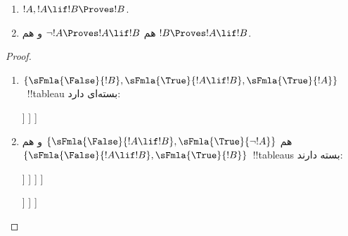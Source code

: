 \documentclass[../../../include/open-logic-section]{subfiles}
\begin{document}
\begin{prop}
  \begin{enumerate}
  \item {} $!A, !A \lif !B \Proves !B$.
  \item {}
    هم $\lnot !A \Proves !A \lif !B$ و هم $!B \Proves !A \lif !B$.
  \end{enumerate}
\end{prop}

\begin{proof}
  \begin{enumerate}
    \item $\{\sFmla{\False}{!B}, \sFmla{\True}{!A \lif !B},
      \sFmla{\True}{!A}\}$~!!{tableau} بسته‌ای دارد:
      \begin{oltableau}
        [\sFmla{\False}{\formula{B}}, just=\TAss
          [\sFmla{\True}{\formula{A} \lif \formula{B}}, just=\TAss
            [\sFmla{\True}{\formula{A}}, just=\TAss
              [\sFmla{\False}{\formula{A}}, just = {\TRule{\True}{\lif}[2]}, close]
              [\sFmla{\True}{\formula{B}}, just = {\TRule{\True}{\lif}[2]}, close]
            ]
          ]
        ]
      \end{oltableau}
    \item هم $\{\sFmla{\False}{!A \lif !B},
      \sFmla{\True}{\lnot !A}\}$ و هم $\{\sFmla{\False}{!A \lif !B},
      \sFmla{\True}{!B}\}$~!!{tableau}s بسته دارند:
      \begin{oltableau}
        [\sFmla{\False}{\formula{A} \lif \formula{B}}, just = \TAss
          [\sFmla{\True}{\lnot \formula{A}}, just = \TAss
            [\sFmla{\True}{\formula{A}}, just = {\TRule{\False}{\lif}[1]}
              [\sFmla{\False}{\formula{B}}, just = {\TRule{\False}{\lif}[1]}
                [\sFmla{\False}{\formula{A}}, just = {\TRule{\True}{\lnot}[2]}, close]
              ]
            ]
          ]
        ]
      \end{oltableau}
      \begin{oltableau}
        [\sFmla{\False}{\formula{A} \lif \formula{B}}, just = \TAss
          [\sFmla{\True}{\formula{B}}, just = \TAss
            [\sFmla{\True}{\formula{A}}, just = {\TRule{\False}{\lif}[1]}
              [\sFmla{\False}{\formula{B}}, just = {\TRule{\False}{\lif}[1]},close
              ]
            ]
          ]
        ]
      \end{oltableau}
  \end{enumerate}
\end{proof}
\end{document}
